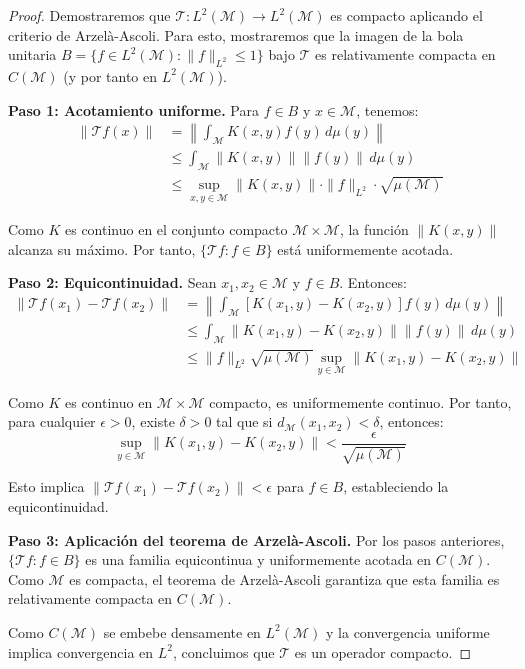 \begin{proof}
    Demostraremos que $\mathcal{T}: L^2(\mathcal{M}) \to L^2(\mathcal{M})$ es compacto aplicando el criterio de Arzelà-Ascoli. Para esto, mostraremos que la imagen de la bola unitaria $B = \{f \in L^2(\mathcal{M}) : \|f\|_{L^2} \leq 1\}$ bajo $\mathcal{T}$ es relativamente compacta en $C(\mathcal{M})$ (y por tanto en $L^2(\mathcal{M})$).
    
    \textbf{Paso 1: Acotamiento uniforme.}
    Para $f \in B$ y $x \in \mathcal{M}$, tenemos:
    \begin{align}
        \|\mathcal{T}f(x)\| &= \left\|\int_{\mathcal{M}} K(x, y) f(y) \, d\mu(y)\right\| \\
        &\leq \int_{\mathcal{M}} \|K(x, y)\| \|f(y)\| \, d\mu(y) \\
        &\leq \sup_{x,y \in \mathcal{M}} \|K(x, y)\| \cdot \|f\|_{L^2} \cdot \sqrt{\mu(\mathcal{M})}
    \end{align}
    
    Como $K$ es continuo en el conjunto compacto $\mathcal{M} \times \mathcal{M}$, la función $\|K(x,y)\|$ alcanza su máximo. Por tanto, $\{\mathcal{T}f : f \in B\}$ está uniformemente acotada.
    
    \textbf{Paso 2: Equicontinuidad.}
    Sean $x_1, x_2 \in \mathcal{M}$ y $f \in B$. Entonces:
    \begin{align}
        \|\mathcal{T}f(x_1) - \mathcal{T}f(x_2)\| &= \left\|\int_{\mathcal{M}} [K(x_1, y) - K(x_2, y)] f(y) \, d\mu(y)\right\| \\
        &\leq \int_{\mathcal{M}} \|K(x_1, y) - K(x_2, y)\| \|f(y)\| \, d\mu(y) \\
        &\leq \|f\|_{L^2} \sqrt{\mu(\mathcal{M})} \sup_{y \in \mathcal{M}} \|K(x_1, y) - K(x_2, y)\|
    \end{align}
    
    Como $K$ es continuo en $\mathcal{M} \times \mathcal{M}$ compacto, es uniformemente continuo. Por tanto, para cualquier $\epsilon > 0$, existe $\delta > 0$ tal que si $d_{\mathcal{M}}(x_1, x_2) < \delta$, entonces:
    \[\sup_{y \in \mathcal{M}} \|K(x_1, y) - K(x_2, y)\| < \frac{\epsilon}{\sqrt{\mu(\mathcal{M})}}\]
    
    Esto implica $\|\mathcal{T}f(x_1) - \mathcal{T}f(x_2)\| < \epsilon$ para $f \in B$, estableciendo la equicontinuidad.
    
    \textbf{Paso 3: Aplicación del teorema de Arzelà-Ascoli.}
    Por los pasos anteriores, $\{\mathcal{T}f : f \in B\}$ es una familia equicontinua y uniformemente acotada en $C(\mathcal{M})$. Como $\mathcal{M}$ es compacta, el teorema de Arzelà-Ascoli garantiza que esta familia es relativamente compacta en $C(\mathcal{M})$.
    
    Como $C(\mathcal{M})$ se embebe densamente en $L^2(\mathcal{M})$ y la convergencia uniforme implica convergencia en $L^2$, concluimos que $\mathcal{T}$ es un operador compacto.
\end{proof}

